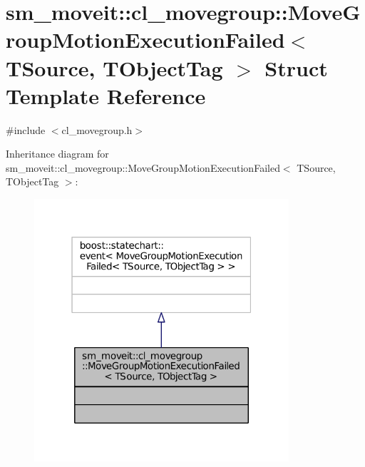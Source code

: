 \hypertarget{structsm__moveit_1_1cl__movegroup_1_1MoveGroupMotionExecutionFailed}{}\section{sm\+\_\+moveit\+:\+:cl\+\_\+movegroup\+:\+:Move\+Group\+Motion\+Execution\+Failed$<$ T\+Source, T\+Object\+Tag $>$ Struct Template Reference}
\label{structsm__moveit_1_1cl__movegroup_1_1MoveGroupMotionExecutionFailed}


{\ttfamily \#include $<$cl\+\_\+movegroup.\+h$>$}



Inheritance diagram for sm\+\_\+moveit\+:\+:cl\+\_\+movegroup\+:\+:Move\+Group\+Motion\+Execution\+Failed$<$ T\+Source, T\+Object\+Tag $>$\+:
\nopagebreak
\begin{figure}[H]
\begin{center}
\leavevmode
\includegraphics[width=268pt]{structsm__moveit_1_1cl__movegroup_1_1MoveGroupMotionExecutionFailed__inherit__graph}
\end{center}
\end{figure}


